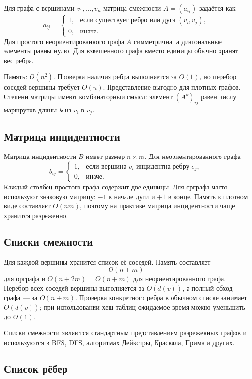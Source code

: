 Для графа с вершинами $v_1,\ldots,v_n$ матрица смежности $A=(a_{ij})$ задаётся
как
\[
 a_{ij}=\begin{cases}
 1, & \text{если существует ребро или дуга }(v_i,v_j),\\
 0, & \text{иначе}.
 \end{cases}
\]
Для простого неориентированного графа $A$ симметрична, а диагональные элементы
равны нулю. Для взвешенного графа вместо единицы обычно хранят вес ребра.

Память: $O(n^2)$. Проверка наличия ребра выполняется за $O(1)$, но перебор
соседей вершины требует $O(n)$. Представление выгодно для плотных графов.
Степени матрицы имеют комбинаторный смысл: элемент $(A^k)_{ij}$ равен числу
маршрутов длины $k$ из $v_i$ в $v_j$.

\subsection{Матрица инцидентности}

Матрица инцидентности $B$ имеет размер $n\times m$. Для неориентированного графа
\[
 b_{ij}=\begin{cases}
 1, & \text{если вершина }v_i\text{ инцидентна ребру }e_j,\\
 0, & \text{иначе}.
 \end{cases}
\]
Каждый столбец простого графа содержит две единицы. Для орграфа часто используют
знаковую матрицу: $-1$ в начале дуги и $+1$ в конце. Память в плотном виде
составляет $O(nm)$, поэтому на практике матрица инцидентности чаще хранится
разреженно.

\subsection{Списки смежности}

Для каждой вершины хранится список её соседей. Память составляет
\[
    O(n+m)
\]
для орграфа и $O(n+2m)=O(n+m)$ для неориентированного графа.
Перебор всех соседей вершины выполняется за $O(d(v))$, а полный обход графа ---
за $O(n+m)$. Проверка конкретного ребра в обычном списке занимает $O(d(v))$;
при использовании хеш-таблиц ожидаемое время можно уменьшить до $O(1)$.

Списки смежности являются стандартным представлением разреженных графов и
используются в BFS, DFS, алгоритмах Дейкстры, Краскала, Прима и других.

\subsection{Список рёбер}

